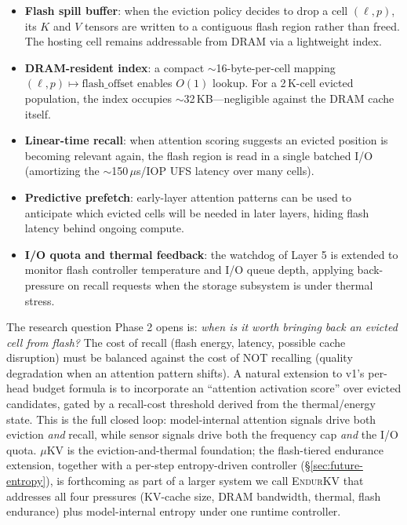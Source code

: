 \documentclass[sigconf, anonymous=false, screen=true]{acmart}
\begin{document}
\begin{itemize}
\item \textbf{Flash spill buffer}: when the eviction policy decides to drop a cell $(\ell, p)$, its $K$ and $V$ tensors are written to a contiguous flash region rather than freed. The hosting cell remains addressable from DRAM via a lightweight index.
\item \textbf{DRAM-resident index}: a compact $\sim$16-byte-per-cell mapping $(\ell, p) \mapsto \text{flash\_offset}$ enables $O(1)$ lookup. For a 2\,K-cell evicted population, the index occupies $\sim$32\,KB---negligible against the DRAM cache itself.
\item \textbf{Linear-time recall}: when attention scoring suggests an evicted position is becoming relevant again, the flash region is read in a single batched I/O (amortizing the $\sim$150\,$\mu$s/IOP UFS latency over many cells).
\item \textbf{Predictive prefetch}: early-layer attention patterns can be used to anticipate which evicted cells will be needed in later layers, hiding flash latency behind ongoing compute.
\item \textbf{I/O quota and thermal feedback}: the watchdog of Layer 5 is extended to monitor flash controller temperature and I/O queue depth, applying back-pressure on recall requests when the storage subsystem is under thermal stress.
\end{itemize}

The research question Phase 2 opens is: \emph{when is it worth bringing back an evicted cell from flash?} The cost of recall (flash energy, latency, possible cache disruption) must be balanced against the cost of NOT recalling (quality degradation when an attention pattern shifts). A natural extension to v1's per-head budget formula is to incorporate an ``attention activation score'' over evicted candidates, gated by a recall-cost threshold derived from the thermal/energy state. This is the full closed loop: model-internal attention signals drive both eviction \emph{and} recall, while sensor signals drive both the frequency cap \emph{and} the I/O quota. \textsc{$\mu$KV} is the eviction-and-thermal foundation; the flash-tiered endurance extension, together with a per-step entropy-driven controller (\S\ref{sec:future-entropy}), is forthcoming as part of a larger system we call \textsc{EndurKV} that addresses all four pressures (KV-cache size, DRAM bandwidth, thermal, flash endurance) plus model-internal entropy under one runtime controller.
\end{document}

